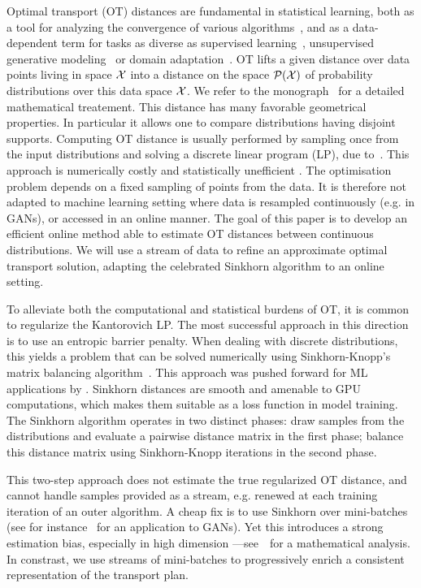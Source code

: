 
Optimal transport (OT) distances are fundamental in statistical learning, both as a tool for analyzing the convergence of various algorithms~\cite{canas2012learning,dalalyan2019user}, and as a data-dependent term for tasks as diverse as supervised learning~\cite{frogner2015learning}, unsupervised generative modeling~\cite{arjovsky2017wgan} or domain adaptation~\cite{courty2016optimal}.
%
OT lifts a given distance over data points living in space $\mathcal{X}$ into a distance
on the space $\mathcal{P}(\mathcal{X})$ of probability distributions over this data space $\mathcal{X}$. We refer to the monograph~\cite{santambrogio2015optimal} for a detailed mathematical treatement.
%
This distance has many favorable geometrical properties. In particular it allows one to compare distributions having disjoint supports. 
% 
Computing OT distance is usually performed by sampling once from the input
distributions and solving a discrete linear program (LP), due to~\citet{Kantorovich42}. This approach is numerically costly and
statistically unefficient \cite{weed2019sharp}. The optimisation problem depends
on a fixed sampling of points from the data. It is therefore not adapted to
machine learning setting where data is resampled continuously (e.g. in GANs), or
accessed in an online manner. The goal of this paper is to develop an efficient
online method able to estimate OT distances between continuous distributions. We will use a stream of data to refine an approximate optimal transport solution, adapting the celebrated Sinkhorn algorithm to an online setting.
  


To alleviate both the computational and statistical burdens of OT, it is common
to regularize the Kantorovich LP.
%
The most successful approach in this direction is to use an entropic barrier penalty. 
%
When dealing with discrete distributions, this yields a problem that can be solved
numerically using Sinkhorn-Knopp's matrix balancing
algorithm~\cite{Sinkhorn64,sinkhorn1967concerning}.
%
This approach was pushed forward for ML applications by
\citet{cuturi2013sinkhorn}. Sinkhorn distances are smooth and amenable to GPU
computations, which makes them suitable as a loss function in model training.
The Sinkhorn algorithm operates in two distinct phases: draw samples from the
distributions and evaluate a pairwise distance matrix in the first phase;
balance this distance matrix using Sinkhorn-Knopp iterations in the second
phase.

This two-step approach does not estimate the true regularized OT
distance, and cannot handle samples provided as a stream, e.g. renewed at each
training iteration of an outer algorithm. A cheap fix is to use Sinkhorn over
mini-batches (see for instance~\citet{2018-Genevay-aistats} for an application
to GANs). Yet this introduces a strong estimation bias, especially in high
dimension ---see~\citet{fatras2019learning} for a mathematical analysis. In
constrast, we use streams of mini-batches to progressively enrich a consistent representation of the
transport plan.

